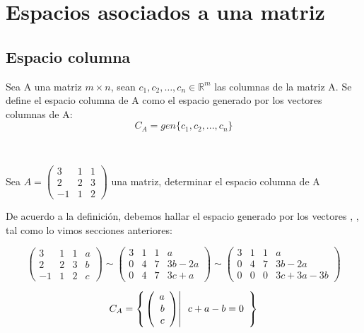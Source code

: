 \chapter{Espacios asociados a una matriz}
\section{Espacio columna}
\begin{dfn}
Sea A una matriz $m\times n$, sean $c_1,c_2,\ldots, c_n \in \mathbb{R}^m$ las columnas de la matriz A. Se define el espacio columna de A como el espacio generado por los vectores columnas de A:
~\\
\[C_A=gen\{c_1, c_2, ..., c_n\}\]
\end{dfn}
~\\

\begin{ejemplo}
Sea $A=
\left(
\begin{array}{rrr}
3&1&1\\
2&2&3\\
-1&1&2
\end{array}
\right)$ una matriz, determinar el espacio columna de A
 
De acuerdo a la definición, debemos hallar el espacio generado por los vectores , ,  tal como lo vimos secciones anteriores:

\[
\left(
\begin{array}{rrr|r}
3&1&1&a\\
2&2&3&b\\
-1&1&2&c
\end{array}
\right)
\sim
\left(
\begin{array}{rrr|r}
3&1&1&a\\
0&4&7&3b-2a\\
0&4&7&3c+a
\end{array}
\right)
\sim
\left(
\begin{array}{rrr|r}
3&1&1&a\\
0&4&7&3b-2a\\
0&0&0&3c+3a-3b
\end{array}
\right)
\]

\[C_A=\left\{ \left. \left( \begin{array}{r} a\\ b\\ c \end{array} \right) \right| \begin{array}{r}
c+a-b=0\\
\end{array} \right\}
\]

\end{ejemplo}

